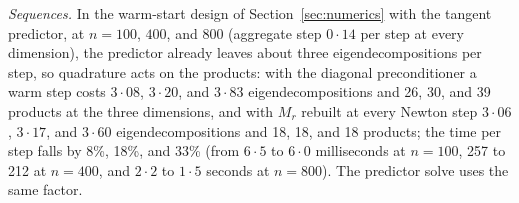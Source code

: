 \documentclass[11pt]{article}
\begin{document}
\emph{Sequences.} In the warm-start design of
Section~\ref{sec:numerics} with the tangent predictor, at $n=100$,
$400$, and $800$ (aggregate step $0{\cdot}14$ per step at every
dimension), the predictor already leaves about three
eigendecompositions per step, so quadrature acts on the products:
with the diagonal preconditioner a warm step costs $3{\cdot}08$, $3{\cdot}20$, and $3{\cdot}83$
eigendecompositions and 26, 30, and 39 products at the three
dimensions, and with $M_r$ rebuilt at every Newton step $3{\cdot}06$, $3{\cdot}17$,
and $3{\cdot}60$ eigendecompositions and 18, 18, and 18 products; the
time per step falls by 8\%, 18\%, and 33\% (from $6{\cdot}5$ to $6{\cdot}0$
milliseconds at $n=100$, 257 to 212 at $n=400$, and $2{\cdot}2$ to $1{\cdot}5$
seconds at $n=800$). The predictor solve uses the same factor.



\end{document}

